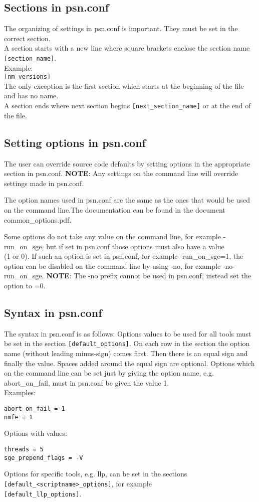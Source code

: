 \subsection{Sections in psn.conf}
The organizing of settings in psn.conf is important. They must be set in the correct section.\\
A section starts with a new line where square brackets enclose the section name
\verb|[section_name]|. \\
Example:\\
\verb|[nm_versions]|\\
The only exception is the first section which starts at the beginning of the file and has no name.\\
A section ends where next section begins
\verb|[next_section_name]| or at the end of the file.

\subsection{Setting options in psn.conf}
The user can override source code defaults by setting options in the appropriate section in psn.conf. \textbf{NOTE}: Any settings on the command line will override settings made in psn.conf. 

The option names used in psn.conf are the same as the ones that would be used on the command line.The documentation can be found in the document common\_options.pdf. 

Some options do not take any value on the command line, for example -run\_on\_sge, but if set in psn.conf those options must also have a value\\ (1 or 0). If such an option is set in psn.conf, for example
-run\_on\_sge=1, the option can be disabled on the command line by using -no, for example 
-no-run\_on\_sge. \textbf{NOTE}: The -no prefix cannot be used in psn.conf, instead set the option to =0.
\subsection {Syntax in psn.conf}
The syntax in psn.conf is as follows: Options values to be used for all tools must be set in the section \verb|[default_options]|. 
On each row in the section the option name (without leading minus-sign) comes first. Then there is an equal sign and finally the value. Spaces added around the equal sign are optional. Options which on the command line can be set just by giving the option name, e.g. abort\_on\_fail, must in psn.conf be given the value 1.\\ Examples:
\begin{verbatim}
abort_on_fail = 1
nmfe = 1
\end{verbatim}
Options with values:
\begin{verbatim}
threads = 5
sge_prepend_flags = -V 
\end{verbatim}
Options for specific tools, e.g. llp, can be set in the sections\\
\verb|[default_<scriptname>_options]|, for example\\
 \verb|[default_llp_options]|.

